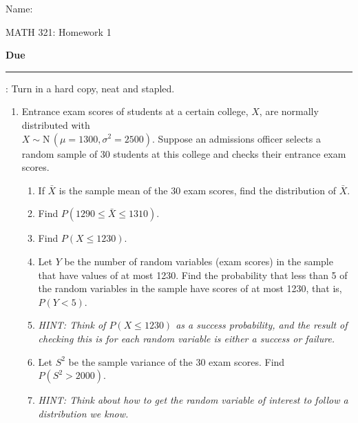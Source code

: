 \documentclass{article}
\newcommand{\blankul}[1]{\rule[-1.5mm]{#1}{0.15mm}}	%
\newcommand{\follow}[1]{\sim \text{#1}\,}		%
\begin{document}
\hspace{375pt}Name:

\begin{center}
{\Huge MATH 321: Homework 1}
\end{center}

\bigskip\bigskip

{\large \textbf{Due} \blankul{4cm}: Turn in a hard copy, neat and stapled.}\bigskip


\begin{enumerate}

    \item Entrance exam scores of students at a certain college, $X$, are normally distributed with \\ $X \follow{N}(\mu = 1300, \sigma^2 = 2500)$. Suppose an admissions officer selects a random sample of 30 students at this college and checks their entrance exam scores.%
    \begin{enumerate}
        \item If $\bar{X}$ is the sample mean of the 30 exam scores, find the distribution of $\bar{X}$.
        \item Find $P(1290 \le \bar{X} \le 1310)$.%
        \item Find $P(X \le 1230)$.%
        \item Let $Y$ be the number of random variables (exam scores) in the sample that have values of at most 1230. Find the probability that less than 5 of the random variables in the sample have scores of at most 1230, that is, $P(Y < 5)$.%
        \item[] \textit{HINT: Think of $P(X \le 1230)$ as a success probability, and the result of checking this is for each random variable is either a success or failure.} 
        \item Let $S^2$ be the sample variance of the 30 exam scores. Find $P(S^2 > 2000)$.%
        \item[] \textit{HINT: Think about how to get the random variable of interest to follow a distribution we know.} 
    \end{enumerate}\bigskip


\end{enumerate}
\end{document}
